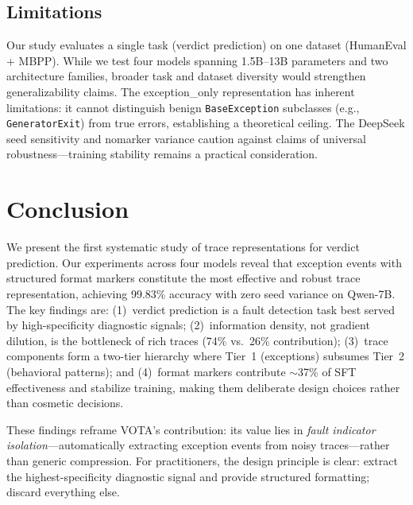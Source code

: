 \documentclass[11pt]{article}
\begin{document}
\subsection{Limitations}

Our study evaluates a single task (verdict prediction) on one dataset (HumanEval + MBPP). While we test four models spanning 1.5B--13B parameters and two architecture families, broader task and dataset diversity would strengthen generalizability claims. The exception\_only representation has inherent limitations: it cannot distinguish benign \texttt{BaseException} subclasses (e.g., \texttt{GeneratorExit}) from true errors, establishing a theoretical ceiling. The DeepSeek seed sensitivity and nomarker variance caution against claims of universal robustness---training stability remains a practical consideration.

\section{Conclusion}

We present the first systematic study of trace representations for verdict prediction. Our experiments across four models reveal that exception events with structured format markers constitute the most effective and robust trace representation, achieving 99.83\% accuracy with zero seed variance on Qwen-7B. The key findings are: (1)~verdict prediction is a fault detection task best served by high-specificity diagnostic signals; (2)~information density, not gradient dilution, is the bottleneck of rich traces (74\% vs.\ 26\% contribution); (3)~trace components form a two-tier hierarchy where Tier~1 (exceptions) subsumes Tier~2 (behavioral patterns); and (4)~format markers contribute $\sim$37\% of SFT effectiveness and stabilize training, making them deliberate design choices rather than cosmetic decisions.

These findings reframe VOTA's contribution: its value lies in \emph{fault indicator isolation}---automatically extracting exception events from noisy traces---rather than generic compression. For practitioners, the design principle is clear: extract the highest-specificity diagnostic signal and provide structured formatting; discard everything else.
\end{document}
